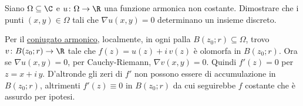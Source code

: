 \begin{exeN}
	Siano \(\Omega\subseteq\C\)  e \(u\colon \Omega \to \R\) una funzione armonica non costante.
	Dimostrare che i punti \((x,y)\in\Omega\) tali che \(\nabla u(x,y)=0\) determinano un insieme discreto.
\end{exeN}

\begin{sol}
	Per il \hyperref[th:coniugatoArmonicoFunzioneOlomorfa]{coniugato armonico}, localmente, in ogni palla \(B(z_0;r)\subseteq \Omega\), trovo \(v\colon B(z_0;r) \to \R\) tale che \(f(z) = u(z)+i\,v(z)\) è olomorfa in \(B(z_0;r)\).
	Ora se \(\nabla u(x,y) = 0\), per Cauchy-Riemann, \(\nabla v(x,y)=0\).
	Quindi \(f'(z)=0\) per \(z=x+i\,y\). D'altronde gli zeri di \(f'\) non possono essere di accumulazione in \(B(z_0;r)\), altrimenti \(f'(z)\equiv 0\) in \(B(z_0;r)\) da cui seguirebbe \(f\) costante che è assurdo per ipotesi.
\end{sol}